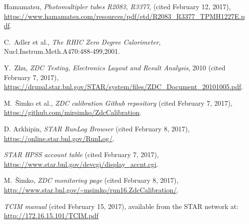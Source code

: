 \begin{thebibliography}{9}
 Hamamatsu, \textit{Photomultipler tubes R2083, R3377}, 
(cited February 12, 2017),
\url{https://www.hamamatsu.com/resources/pdf/etd/R2083_R3377_TPMH1227E.pdf}.

 C.\ Adler et al., \textit{The RHIC Zero Degree Calorimeter},
Nucl.Instrum.Meth.A470:488-499,2001.

 Y.\ Zhu, \textit{ZDC Testing, Electronics Layout and Result Analysis}, 2010
(cited February 7, 2017),
\url{https://drupal.star.bnl.gov/STAR/system/files/ZDC_Document_20101005.pdf}.

 M.\ Šimko et al., \textit{ZDC calibration Github repository}
(cited February 7, 2017), \url{https://github.com/mirsimko/ZdcCalibration}.

 D. Arkhipin, \textit{STAR RunLog Browser} (cited February 8, 2017),
\url{https://online.star.bnl.gov/RunLog/}.

 \textit{STAR HPSS account table} (cited February 7, 2017),
\url{https://www.star.bnl.gov/devcgi/display_accnt.cgi}.

 M.\ Šimko, \textit{ZDC monitoring page} (cited February 8, 2017),
\url{http://www.star.bnl.gov/~msimko/run16.ZdcCalibration/}.

 \textit{TCIM manual} (cited February 15, 2017), available from the STAR network 
at: \url{http://172.16.15.101/TCIM.pdf}
\end{thebibliography}
